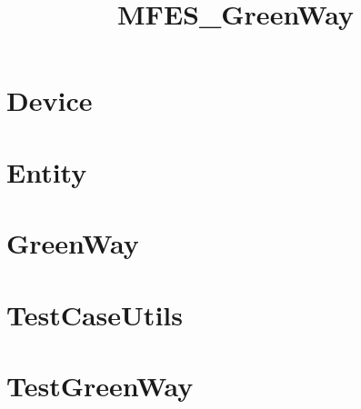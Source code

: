 \documentclass{article}
\begin{document}
\title{MFES\_GreenWay}
\author{}
\maketitle
\tableofcontents

\section{Device}

\section{Entity}

\section{GreenWay}

\section{TestCaseUtils}

\section{TestGreenWay}

\end{document}
